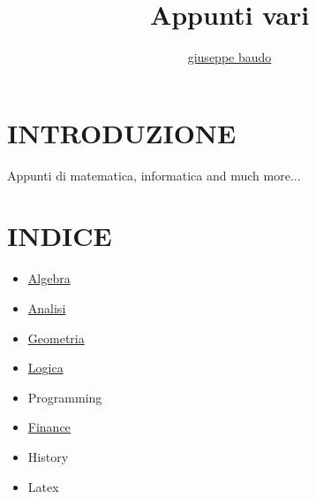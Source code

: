 \documentclass[a4paper,10pt]{article}
\title{Appunti vari}
\author{\href{http://www.baudo.hol.es}{giuseppe baudo}}
\begin{document}
\maketitle

\section{INTRODUZIONE}
Appunti di matematica, informatica and much more...

\section{INDICE}
\begin{itemize}
  \item \href{./algebra/AlgebraIndex.html}{Algebra}
  \item \href{./analisi/Analisi.html}{Analisi} 
  \item \href{./geometria/Geometria.html}{Geometria} 
  \item \href{./logica/Logics.html}{Logica}
  \item Programming
  \item \href{./finance/finance.html}{Finance} 
  \item History 
  \item Latex 
  
\end{itemize}
\end{document}
